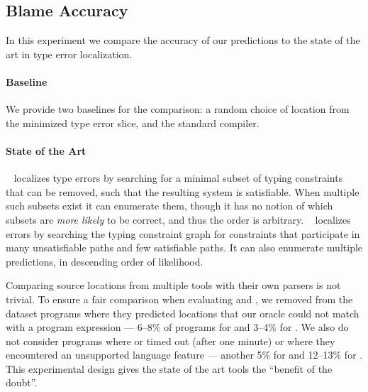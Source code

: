 \subsection{Blame Accuracy}
\label{sec:quantitative}

In this experiment we compare the accuracy of our predictions to the
state of the art in type error localization.

\paragraph{Baseline}
We provide two baselines for the comparison: a random choice of location
from the minimized type error slice, and the standard \ocaml compiler.

\paragraph{State of the Art}
\mycroft~\citep{Loncaric2016-uk} localizes type errors by searching for
a minimal subset of typing constraints that can be removed, such that
the resulting system is satisfiable.
%
When multiple such subsets exist it can enumerate them, though it has no
notion of which subsets are \emph{more likely} to be correct, and thus
the order is arbitrary.
%
\sherrloc~\citep{Zhang2014-lv} localizes errors by searching the typing
constraint graph for constraints that participate in many unsatisfiable
paths and few satisfiable paths.
%
It can also enumerate multiple predictions, in descending order of
likelihood.

Comparing source locations from multiple tools with their own parsers is
not trivial.
%
To ensure a fair comparison when evaluating \mycroft and
\sherrloc, we removed from the dataset programs where they predicted
locations that our oracle could not match with a program expression ---
6--8\% of programs for \mycroft and 3--4\% for \sherrloc.
%
We also do not consider programs where \mycroft or \sherrloc timed out
(after one minute) or where they encountered an unsupported language
feature --- another 5\% for \mycroft and 12--13\% for \sherrloc. This
experimental design gives the state of the art tools the ``benefit of the
doubt''.


